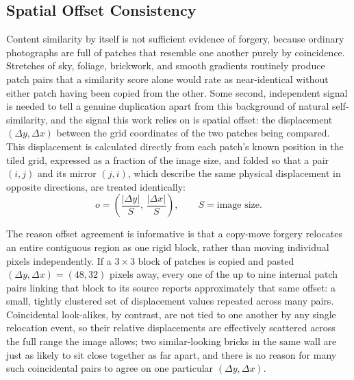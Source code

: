 \documentclass[conference]{IEEEtran}
\begin{document}
\subsection{Spatial Offset Consistency}\label{sec:offset}
Content similarity by itself is not sufficient evidence of forgery, because ordinary photographs are full of patches that resemble one another purely by coincidence. Stretches of sky, foliage, brickwork, and smooth gradients routinely produce patch pairs that a similarity score alone would rate as near-identical without either patch having been copied from the other. Some second, independent signal is needed to tell a genuine duplication apart from this background of natural self-similarity, and the signal this work relies on is spatial offset: the displacement $(\Delta y, \Delta x)$ between the grid coordinates of the two patches being compared. This displacement is calculated directly from each patch's known position in the tiled grid, expressed as a fraction of the image size, and folded so that a pair $(i,j)$ and its mirror $(j,i)$, which describe the same physical displacement in opposite directions, are treated identically:
\begin{equation}
o = \left(\frac{|\Delta y|}{S},\, \frac{|\Delta x|}{S}\right), \qquad S = \text{image size}.
\label{eq:offset}
\end{equation}

The reason offset agreement is informative is that a copy-move forgery relocates an entire contiguous region as one rigid block, rather than moving individual pixels independently. If a $3\times3$ block of patches is copied and pasted $(\Delta y, \Delta x) = (48, 32)$ pixels away, every one of the up to nine internal patch pairs linking that block to its source reports approximately that same offset: a small, tightly clustered set of displacement values repeated across many pairs. Coincidental look-alikes, by contrast, are not tied to one another by any single relocation event, so their relative displacements are effectively scattered across the full range the image allows; two similar-looking bricks in the same wall are just as likely to sit close together as far apart, and there is no reason for many such coincidental pairs to agree on one particular $(\Delta y, \Delta x)$.
\end{document}
